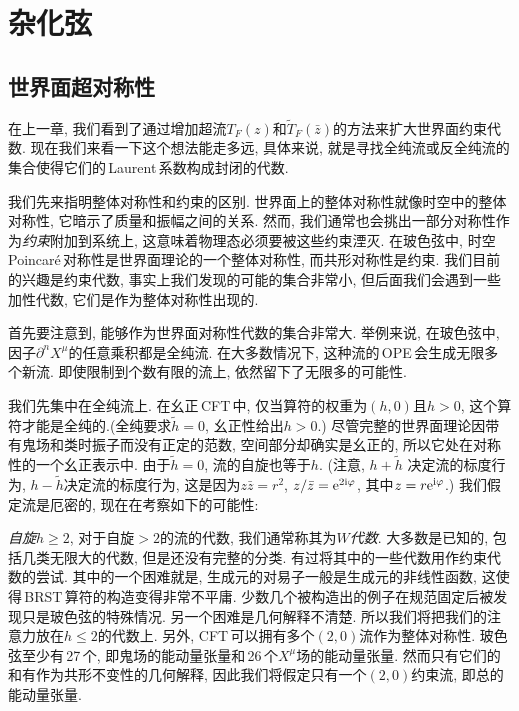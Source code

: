 \chapter{杂化弦}

\section{世界面超对称性}

在上一章, 我们看到了通过增加超流$ T_{F}(z) $和$ \tilde{T}_{F}(\bar{z}) $的方法来扩大世界面约束代数. 现在我们来看一下这个想法能走多远, 具体来说, 就是寻找全纯流或反全纯流的集合使得它们的\,Laurent\,系数构成封闭的代数.

我们先来指明整体对称性和约束的区别. 世界面上的整体对称性就像时空中的整体对称性, 它暗示了质量和振幅之间的关系. 然而, 我们通常也会挑出一部分对称性作为{\emph{约束}}附加到系统上, 这意味着物理态必须要被这些约束湮灭. 在玻色弦中, 时空\,Poincar\'{e}\,对称性是世界面理论的一个整体对称性, 而共形对称性是约束. 我们目前的兴趣是约束代数, 事实上我们发现的可能的集合非常小, 但后面我们会遇到一些加性代数, 它们是作为整体对称性出现的. 

首先要注意到, 能够作为世界面对称性代数的集合非常大. 举例来说, 在玻色弦中, 因子$ \partial^{n}X^{\mu} $的任意乘积都是全纯流. 在大多数情况下, 这种流的\,OPE\,会生成无限多个新流. 即使限制到个数有限的流上, 依然留下了无限多的可能性.

我们先集中在全纯流上. 在幺正\,CFT\,中, 仅当算符的权重为$ (h,0) $且$ h>0$, 这个算符才能是全纯的.(全纯要求$ \tilde{h}=0$, 幺正性给出$ h>0$.) 尽管完整的世界面理论因带有鬼场和类时振子而没有正定的范数, 空间部分却确实是幺正的, 所以它处在对称性的一个幺正表示中. 由于$ \tilde{h}=0$, 流的自旋也等于$ h$. (注意, $h+\tilde{h}$ 决定流的标度行为, $h-\tilde{h} $决定流的标度行为, 这是因为$ z\bar{z}=r^{2}$, $ z/\bar{z}=\mathrm{e}^{2\mathrm{i}\varphi}$, 其中$ z=r\mathrm{e}^{\mathrm{i}\varphi}$.) 我们假定流是厄密的, 现在在考察如下的可能性:

{\emph{自旋}}$ h\geq 2$, 对于自旋$ >2 $的流的代数, 我们通常称其为$ W ${\emph{代数}}. 大多数是已知的, 包括几类无限大的代数, 但是还没有完整的分类. 有过将其中的一些代数用作约束代数的尝试. 其中的一个困难就是, 生成元的对易子一般是生成元的非线性函数, 这使得\,BRST\,算符的构造变得非常不平庸. 少数几个被构造出的例子在规范固定后被发现只是玻色弦的特殊情况. 另一个困难是几何解释不清楚. 所以我们将把我们的注意力放在$ h\leq 2 $的代数上. 另外, CFT\,可以拥有多个$ (2,0) $流作为整体对称性. 玻色弦至少有\,27\,个, 即鬼场的能动量张量和\,26\,个$ X^{\mu} $场的能动量张量. 然而只有它们的和有作为共形不变性的几何解释, 因此我们将假定只有一个$(2,0)$约束流, 即总的能动量张量.

